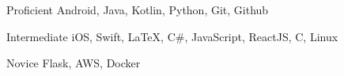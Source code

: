 


\begin{cvskills}


\cvskill
{Proficient} %
{Android, Java, Kotlin, Python, Git, Github} %


\cvskill
{Intermediate} %
{iOS, Swift, LaTeX, C\#, JavaScript, ReactJS, C, Linux} %


\cvskill
{Novice} %
{Flask, AWS, Docker} %


\end{cvskills}